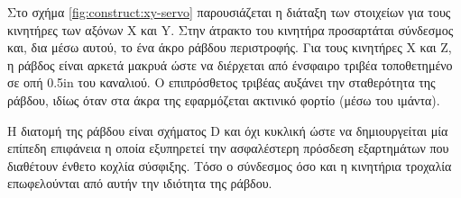 Στο σχήμα \ref{fig:construct:xy-servo} παρουσιάζεται η διάταξη των στοιχείων για
τους κινητήρες των αξόνων X και Y.
Στην άτρακτο του κινητήρα προσαρτάται σύνδεσμος και, δια μέσω αυτού, το ένα άκρο
ράβδου περιστροφής. Για τους κινητήρες X και Z, η ράβδος είναι αρκετά μακρυά
ώστε να διέρχεται από ένσφαιρο τριβέα τοποθετημένο σε οπή 0.5in του καναλιού. Ο
επιπρόσθετος τριβέας αυξάνει την σταθερότητα της ράβδου, ιδίως όταν στα άκρα της
εφαρμόζεται ακτινικό φορτίο (μέσω του ιμάντα).

Η διατομή της ράβδου είναι σχήματος D και όχι κυκλική ώστε να δημιουργείται μία
επίπεδη επιφάνεια η οποία εξυπηρετεί την ασφαλέστερη πρόσδεση εξαρτημάτων που
διαθέτουν ένθετο κοχλία σύσφιξης. Τόσο ο σύνδεσμος όσο και η κινητήρια τροχαλία
επωφελούνται από αυτήν την ιδιότητα της ράβδου.

















